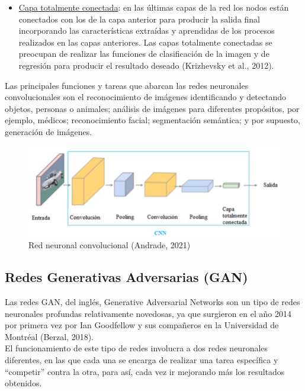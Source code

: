 \begin{itemize}
	\item \underline{Capa totalmente conectada}: en las últimas capas de la red los nodos están conectados con los de la capa anterior para producir la salida final incorporando las características extraídas y aprendidas de los procesos realizados en las capas anteriores. Las capas totalmente conectadas se preocupan de realizar las funciones de clasificación de la imagen y de regresión para producir el resultado deseado (Krizhevsky et al., 2012). \\
	

\end{itemize}

	Las principales funciones y tareas que abarcan las redes neuronales convolucionales son el reconocimiento de imágenes identificando y detectando objetos, personas o animales; análisis de imágenes para diferentes propósitos, por ejemplo, médicos; reconocimiento facial; segmentación semántica; y por supuesto, generación de imágenes.\\
\begin{figure}[h]
	\centering
	\includegraphics[width = 1 \textwidth]{Imagenes/Vectorial/cnn.png}
	\caption{Red neuronal convolucional (Andrade, 2021)}
	\label{fig:cnn}
\end{figure}

\subsection{Redes Generativas Adversarias (GAN)}

Las redes GAN, del inglés, Generative Adversarial Networks son un tipo de redes neuronales profundas relativamente novedosas, ya que surgieron en el año 2014 por primera vez por Ian Goodfellow y sus compañeros en la Universidad de Montréal (Berzal, 2018). \\

El funcionamiento de este tipo de redes involucra a dos redes neuronales diferentes, en las que cada una se encarga de realizar una tarea específica y “competir” contra la otra, para así, cada vez ir mejorando más los resultados obtenidos. \\

